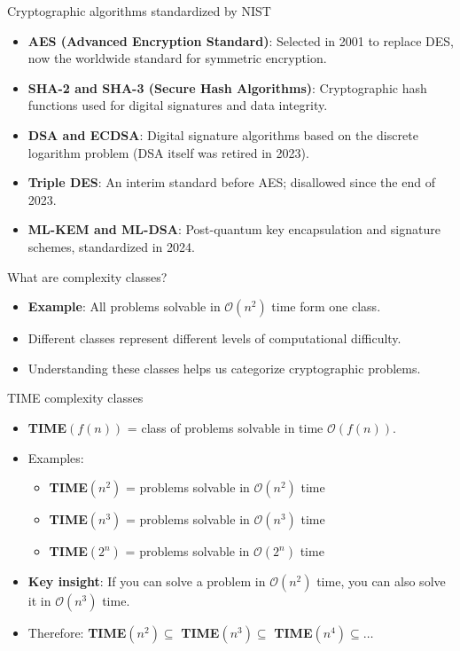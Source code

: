 \ifdefined\PRESENTATION\else\PassOptionsToClass{handout}{beamer}\fi\documentclass[aspectratio=169, lualatex]{beamer}
\begin{document}
\begin{frame}{Cryptographic algorithms standardized by NIST}
	\begin{itemize}[<+->]
		\item \textbf{AES (Advanced Encryption Standard)}: Selected in 2001 to replace DES, now the worldwide standard for symmetric encryption.
		\item \textbf{SHA-2 and SHA-3 (Secure Hash Algorithms)}: Cryptographic hash functions used for digital signatures and data integrity.
		\item \textbf{DSA and ECDSA}: Digital signature algorithms based on the discrete logarithm problem (DSA itself was retired in 2023).
		\item \textbf{Triple DES}: An interim standard before AES; disallowed since the end of 2023.
		\item \textbf{ML-KEM and ML-DSA}: Post-quantum key encapsulation and signature schemes, standardized in 2024.
	\end{itemize}
\end{frame}

\begin{frame}{What are complexity classes?}
	\begin{itemize}[<+->]
		\item \textbf{Example}: All problems solvable in $\mathcal{O}(n^2)$ time form one class.
		\item Different classes represent different levels of computational difficulty.
		\item Understanding these classes helps us categorize cryptographic problems.
	\end{itemize}
\end{frame}

\begin{frame}{TIME complexity classes}
	\begin{itemize}[<+->]
		\item \textbf{TIME}$(f(n))$ = class of problems solvable in time $\mathcal{O}(f(n))$.
		\item Examples:
		      \begin{itemize}
			      \item \textbf{TIME}$(n^2)$ = problems solvable in $\mathcal{O}(n^2)$ time
			      \item \textbf{TIME}$(n^3)$ = problems solvable in $\mathcal{O}(n^3)$ time
			      \item \textbf{TIME}$(2^n)$ = problems solvable in $\mathcal{O}(2^n)$ time
		      \end{itemize}
		\item \textbf{Key insight}: If you can solve a problem in $\mathcal{O}(n^2)$ time, you can also solve it in $\mathcal{O}(n^3)$ time.
		\item Therefore: \textbf{TIME}$(n^2) \subseteq$ \textbf{TIME}$(n^3) \subseteq$ \textbf{TIME}$(n^4) \subseteq \ldots$
	\end{itemize}
\end{frame}
\end{document}
